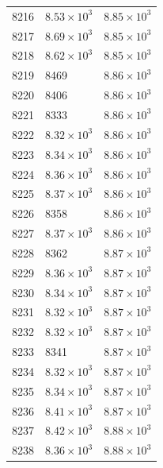 \begin{table}[H]
\begin{tabular}{lll}
8216 & $\displaystyle 8.53 \times 10^{3}$ & $\displaystyle 8.85 \times 10^{3}$ \\
8217 & $\displaystyle 8.69 \times 10^{3}$ & $\displaystyle 8.85 \times 10^{3}$ \\
8218 & $\displaystyle 8.62 \times 10^{3}$ & $\displaystyle 8.85 \times 10^{3}$ \\
8219 & 8469 & $\displaystyle 8.86 \times 10^{3}$ \\
8220 & 8406 & $\displaystyle 8.86 \times 10^{3}$ \\
8221 & 8333 & $\displaystyle 8.86 \times 10^{3}$ \\
8222 & $\displaystyle 8.32 \times 10^{3}$ & $\displaystyle 8.86 \times 10^{3}$ \\
8223 & $\displaystyle 8.34 \times 10^{3}$ & $\displaystyle 8.86 \times 10^{3}$ \\
8224 & $\displaystyle 8.36 \times 10^{3}$ & $\displaystyle 8.86 \times 10^{3}$ \\
8225 & $\displaystyle 8.37 \times 10^{3}$ & $\displaystyle 8.86 \times 10^{3}$ \\
8226 & 8358 & $\displaystyle 8.86 \times 10^{3}$ \\
8227 & $\displaystyle 8.37 \times 10^{3}$ & $\displaystyle 8.86 \times 10^{3}$ \\
8228 & 8362 & $\displaystyle 8.87 \times 10^{3}$ \\
8229 & $\displaystyle 8.36 \times 10^{3}$ & $\displaystyle 8.87 \times 10^{3}$ \\
8230 & $\displaystyle 8.34 \times 10^{3}$ & $\displaystyle 8.87 \times 10^{3}$ \\
8231 & $\displaystyle 8.32 \times 10^{3}$ & $\displaystyle 8.87 \times 10^{3}$ \\
8232 & $\displaystyle 8.32 \times 10^{3}$ & $\displaystyle 8.87 \times 10^{3}$ \\
8233 & 8341 & $\displaystyle 8.87 \times 10^{3}$ \\
8234 & $\displaystyle 8.32 \times 10^{3}$ & $\displaystyle 8.87 \times 10^{3}$ \\
8235 & $\displaystyle 8.34 \times 10^{3}$ & $\displaystyle 8.87 \times 10^{3}$ \\
8236 & $\displaystyle 8.41 \times 10^{3}$ & $\displaystyle 8.87 \times 10^{3}$ \\
8237 & $\displaystyle 8.42 \times 10^{3}$ & $\displaystyle 8.88 \times 10^{3}$ \\
8238 & $\displaystyle 8.36 \times 10^{3}$ & $\displaystyle 8.88 \times 10^{3}$ \\

\end{tabular}
\end{table}
